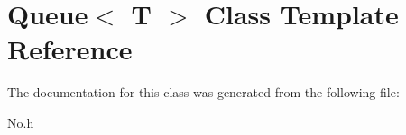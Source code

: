 \hypertarget{class_queue}{\section{Queue$<$ T $>$ Class Template Reference}
\label{class_queue}
}


The documentation for this class was generated from the following file\-:\begin{DoxyCompactItemize}
\item 
No.\-h\end{DoxyCompactItemize}
